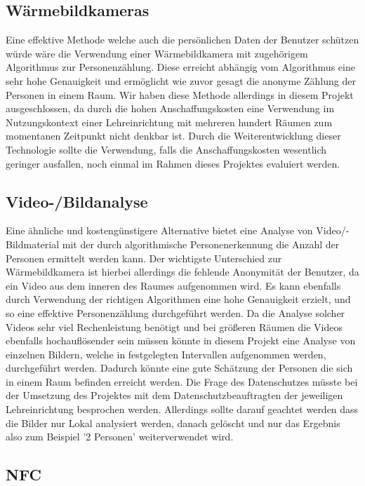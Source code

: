 \subsection{Wärmebildkameras}
\label{anhang:Wärmebildkameras}

Eine effektive Methode welche auch die persönlichen Daten der Benutzer
schützen würde wäre die Verwendung einer Wärmebildkamera mit zugehörigem
Algorithmus zur Personenzählung. Diese erreicht abhängig vom Algorithmus
eine sehr hohe Genauigkeit und ermöglicht wie zuvor gesagt die anonyme
Zählung der Personen in einem Raum. Wir haben diese Methode allerdings in
diesem Projekt ausgeschlossen, da durch die hohen Anschaffungskosten
eine Verwendung im Nutzungskontext einer Lehreinrichtung mit mehreren
hundert Räumen zum momentanen Zeitpunkt nicht denkbar ist.
Durch die Weiterentwicklung dieser Technologie sollte die Verwendung,
falls die Anschaffungskosten wesentlich geringer ausfallen, noch einmal
im Rahmen dieses Projektes evaluiert werden.

\subsection{Video-/Bildanalyse}
\label{anhang:Video_Bildanalyse}


Eine ähnliche und kostengünstigere Alternative bietet eine Analyse von
Video/- \bzw Bildmaterial mit der durch algorithmische Personenerkennung 
die Anzahl der Personen ermittelt werden kann. 
Der wichtigste Unterschied zur Wärmebildkamera ist hierbei
allerdings die fehlende Anonymität der Benutzer, da ein Video aus dem
inneren des Raumes aufgenommen wird. Es kann ebenfalls durch Verwendung
der richtigen Algorithmen eine hohe Genauigkeit erzielt, und so
eine effektive Personenzählung durchgeführt werden. Da die Analyse
solcher Videos sehr viel Rechenleistung benötigt und bei größeren Räumen
die Videos ebenfalls hochauflösender sein müssen könnte in diesem Projekt
eine Analyse von einzelnen Bildern, welche in festgelegten Intervallen
aufgenommen werden, durchgeführt werden. Dadurch könnte eine gute
Schätzung der Personen die sich in einem Raum befinden erreicht werden.
Die Frage des Datenschutzes müsste bei der Umsetzung des Projektes mit
dem Datenschutzbeauftragten der jeweiligen Lehreinrichtung besprochen
werden. Allerdings sollte darauf geachtet werden dass die Bilder nur
Lokal analysiert werden, danach gelöscht und nur das Ergebnis also
zum Beispiel '2 Personen' weiterverwendet wird.

\subsection{NFC}
\label{anhang:NFC}

